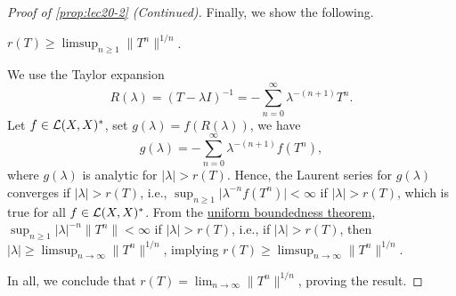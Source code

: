 \begin{proof}[Proof of \autoref{prop:lec20-2} (Continued)]
	Finally, we show the following.
	\begin{claim}
		\(r(T) \geq \limsup_{n \geq 1} \lVert T^n \rVert ^{1 / n} \).
	\end{claim}
	\begin{explanation}
		We use the Taylor expansion
		\[
			R(\lambda ) = (T - \lambda I)^{-1} = - \sum_{n=0}^{\infty} \lambda ^{-(n+1)}T^n.
		\]
		Let \(f\in \mathcal{\MakeUppercase{l}} (X, X)^{\ast} \), set \(g(\lambda ) = f(R(\lambda ))\), we have
		\[
			g(\lambda ) = - \sum_{n=0}^{\infty} \lambda ^{-(n+1)} f(T^n),
		\]
		where \(g(\lambda )\) is analytic for \(\vert \lambda  \vert > r(T)\). Hence, the Laurent series for \(g(\lambda )\) converges if \(\vert \lambda  \vert > r(T)\), i.e., \(\sup _{n\geq 1} \vert \lambda ^{-n} f(T^n) \vert < \infty\) if \(\vert \lambda  \vert > r(T)\), which is true for all \(f\in \mathcal{\MakeUppercase{l}} (X, X)^{\ast} \). From the \hyperref[thm:uniform-boundedness]{uniform boundedness theorem}, \(\sup _{n\geq 1} \vert \lambda  \vert^{-n} \lVert T^n \rVert < \infty\) if \(\vert \lambda  \vert > r(T) \), i.e., if \(\vert \lambda  \vert > r(T) \), then \(\vert \lambda \vert \geq \limsup_{n \to \infty} \lVert T^n \rVert ^{1 / n}\), implying \(r(T) \geq \limsup_{n \to \infty} \lVert T^n \rVert ^{1 / n}\).
	\end{explanation}

	In all, we conclude that \(r(T) = \lim_{n \to \infty} \lVert T^n \rVert ^{1 / n}\), proving the result.
\end{proof}

